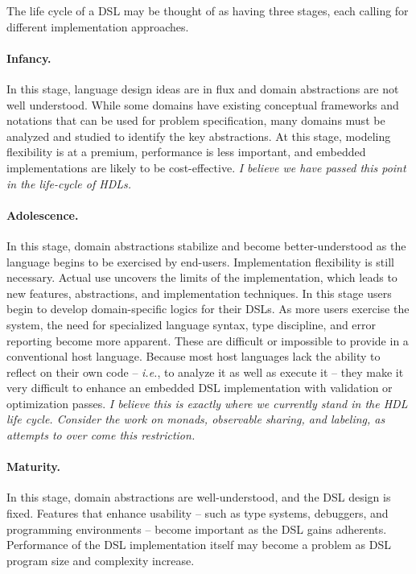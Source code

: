 \documentclass[10pt,twoside]{article}
\begin{document}
The life cycle of a DSL may be thought of as having three stages, each
calling for different implementation approaches.

\paragraph{Infancy.} 

In this stage, language design ideas are in flux and domain 
abstractions are not well understood.  While some domains have 
existing conceptual frameworks and notations that can be used for 
problem specification, many domains must be analyzed and studied to 
identify the key abstractions.  At this stage, modeling flexibility is 
at a premium, performance is less important, and embedded 
implementations are likely to be cost-effective. {\em I believe
we have passed this point in the life-cycle of HDLs.}

\paragraph{Adolescence.} 

In this stage, domain abstractions stabilize and become better-understood
as the language begins to be exercised by end-users. Implementation 
flexibility is still necessary.  Actual use uncovers the limits of the
implementation, which leads to new features, abstractions, and
implementation techniques. In this stage users begin to develop 
domain-specific logics for their DSLs.  As more users
exercise the system, the need for specialized language syntax, type
discipline, and error reporting become more apparent. These are
difficult or impossible to provide in a conventional host language.
Because most host languages lack the ability to reflect on their own
code -- \textit{i.e.}, to analyze it as well as execute it -- they make
it very difficult to enhance an embedded DSL implementation with
validation or optimization passes. {\em I believe this is exactly where
we currently stand in the HDL life cycle. Consider the work on
monads\cite{ruby}, observable sharing\cite{koen2001}, and labeling\cite{odonnel}, as
attempts to over come this restriction.}



\paragraph{Maturity.}

In this stage, domain abstractions are well-understood, and the DSL
design is fixed.  Features that enhance usability -- such as type systems,
debuggers, and programming environments -- become important as the DSL
gains adherents.  Performance of the DSL implementation itself may
become a problem as DSL program size and complexity increase.
\end{document}
